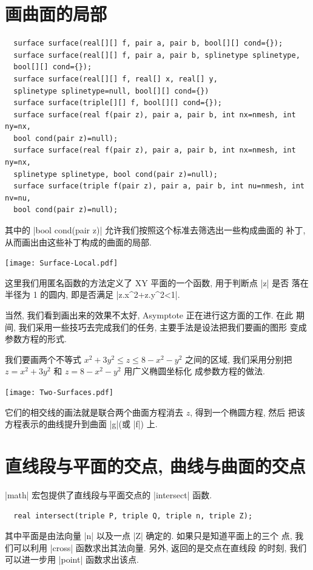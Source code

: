 \documentclass{ctexbook}
\let\leq\leqslant
\begin{document}
\section{画曲面的局部}
\begin{lstlisting}
  surface surface(real[][] f, pair a, pair b, bool[][] cond={});
  surface surface(real[][] f, pair a, pair b, splinetype splinetype,
  bool[][] cond={});
  surface surface(real[][] f, real[] x, real[] y,
  splinetype splinetype=null, bool[][] cond={})
  surface surface(triple[][] f, bool[][] cond={});
  surface surface(real f(pair z), pair a, pair b, int nx=nmesh, int ny=nx,
  bool cond(pair z)=null);
  surface surface(real f(pair z), pair a, pair b, int nx=nmesh, int ny=nx,
  splinetype splinetype, bool cond(pair z)=null);
  surface surface(triple f(pair z), pair a, pair b, int nu=nmesh, int nv=nu,
  bool cond(pair z)=null);
\end{lstlisting}
其中的 |bool cond(pair z)| 允许我们按照这个标准去筛选出一些构成曲面的
补丁, 从而画出由这些补丁构成的曲面的局部.
\begin{center}\texttt{[image: Surface-Local.pdf]}\end{center}%

这里我们用匿名函数的方法定义了 XY 平面的一个函数, 用于判断点 |z| 是否
落在半径为 1 的圆内, 即是否满足 |z.x^2+z.y^2<1|.

当然, 我们看到画出来的效果不太好, Asymptote 正在进行这方面的工作. 在此
期间, 我们采用一些技巧去完成我们的任务, 主要手法是设法把我们要画的图形
变成参数方程的形式.

我们要画两个不等式 $x^{2}+3y^{2}\leq z \leq 8-x^{2}-y^{2}$ 之间的区域,
我们采用分别把 $z=x^{2}+3y^{2}$ 和 $z=8-x^{2}-y^{2}$ 用广义椭圆坐标化
成参数方程的做法.
\begin{center}\texttt{[image: Two-Surfaces.pdf]}\end{center}%

它们的相交线的画法就是联合两个曲面方程消去 $z$, 得到一个椭圆方程, 然后
把该方程表示的曲线提升到曲面 |g|(或 |f|) 上.

\section{直线段与平面的交点, 曲线与曲面的交点}
|math| 宏包提供了直线段与平面交点的 |intersect| 函数.
\begin{lstlisting}
  real intersect(triple P, triple Q, triple n, triple Z);
\end{lstlisting}
其中平面是由法向量 |n| 以及一点 |Z| 确定的. 如果只是知道平面上的三个
点, 我们可以利用 |cross| 函数求出其法向量. 另外, 返回的是交点在直线段
的时刻, 我们可以进一步用 |point| 函数求出该点.
\end{document}
